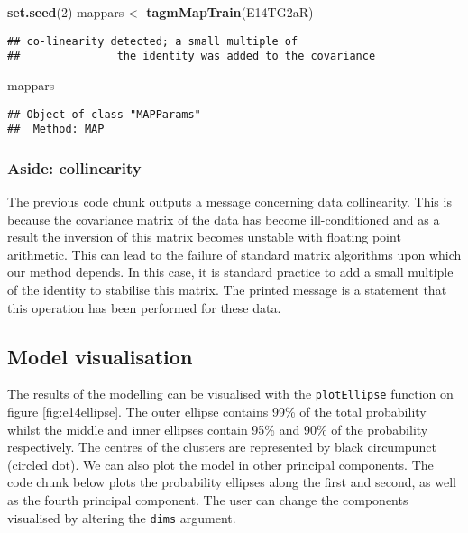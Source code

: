 \documentclass[9pt,a4paper,]{extarticle}
\newenvironment{Shaded}{\begin{snugshade}}{\end{snugshade}}
\newcommand{\DecValTok}[1]{\textcolor[rgb]{0.00,0.00,0.81}{#1}}
\newcommand{\KeywordTok}[1]{\textcolor[rgb]{0.13,0.29,0.53}{\textbf{#1}}}
\newcommand{\NormalTok}[1]{#1}
\newcommand{\StringTok}[1]{\textcolor[rgb]{0.31,0.60,0.02}{#1}}
\begin{document}
\begin{Shaded}
\begin{Highlighting}[]
\KeywordTok{set.seed}\NormalTok{(}\DecValTok{2}\NormalTok{)}
\NormalTok{mappars <-}\StringTok{ }\KeywordTok{tagmMapTrain}\NormalTok{(E14TG2aR)}
\end{Highlighting}
\end{Shaded}

\begin{verbatim}
## co-linearity detected; a small multiple of
##               the identity was added to the covariance
\end{verbatim}

\begin{Shaded}
\begin{Highlighting}[]
\NormalTok{mappars}
\end{Highlighting}
\end{Shaded}

\begin{verbatim}
## Object of class "MAPParams"
##  Method: MAP
\end{verbatim}

\hypertarget{aside-collinearity}{%
\subsubsection*{Aside: collinearity}\label{aside-collinearity}}

The previous code chunk outputs a message concerning data collinearity.
This is because the covariance matrix of the data has become ill-conditioned
and as a result the inversion of this matrix becomes unstable with floating
point arithmetic. This can lead to the failure of standard matrix algorithms upon
which our method depends. In this case, it is standard practice to add a small
multiple of the identity to stabilise this matrix.
The printed message is a statement that this operation has been performed
for these data.

\hypertarget{model-visualisation}{%
\subsection{Model visualisation}\label{model-visualisation}}

The results of the modelling can be visualised with the \texttt{plotEllipse}
function on figure \ref{fig:e14ellipse}. The outer ellipse contains
99\% of the total probability whilst the middle and inner ellipses
contain 95\% and 90\% of the probability respectively. The centres of
the clusters are represented by black circumpunct (circled dot). We
can also plot the model in other principal components. The code chunk
below plots the probability ellipses along the first and second, as
well as the fourth principal component. The user can change the
components visualised by altering the \texttt{dims} argument.
\end{document}
